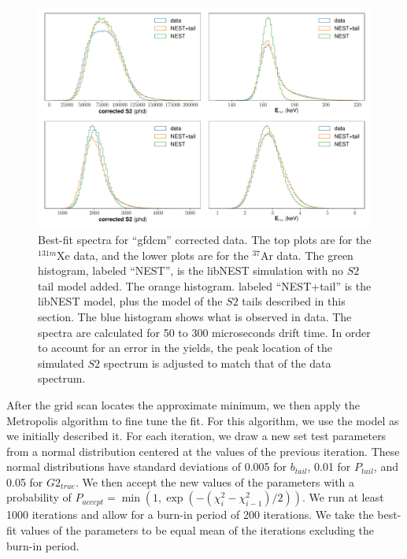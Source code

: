 {\begin{figure}[h!]
  \centering
  \includegraphics[width=\textwidth]{Figures/S2tail_hists_gfdcm.pdf}
\caption{Best-fit spectra for ``gfdcm'' corrected data. The top plots are for the $^{131m}$Xe data, and the lower plots are for the $^{37}$Ar data. The green histogram, labeled ``NEST'', is the libNEST simulation with no $S2$ tail model added. The orange histogram. labeled ``NEST+tail'' is the libNEST model, plus the model of the $S2$ tails described in this section. The blue histogram shows what is observed in data. The spectra are calculated for 50 to 300 microseconds drift time. In order to account for an error in the yields, the peak location of the simulated $S2$ spectrum is adjusted to match that of the data spectrum.}
\label{fig:s2bestfit_spec_gfdcm}
\end{figure}

After the grid scan locates the approximate minimum, we then apply the Metropolis algorithm to fine tune the fit\cite{metropolis_1,metropolis_2}. For this algorithm, we use the model as we initially described it. For each iteration, we draw a new set test parameters from a normal distribution centered at the values of the previous iteration. These normal distributions have standard deviations of  0.005 for $b_{tail}$, 0.01 for $P_{tail}$, and 0.05 for $G2_{true}$. We then accept the new values of the parameters with a probability of $P_{accept}=\min(1,\exp(-(\chi_i^2-\chi_{i-1}^2)/2))$. We run at least 1000 iterations and allow for a burn-in period of 200 iterations. We take the best-fit values of the parameters to be equal mean of the iterations excluding the burn-in period.

}
